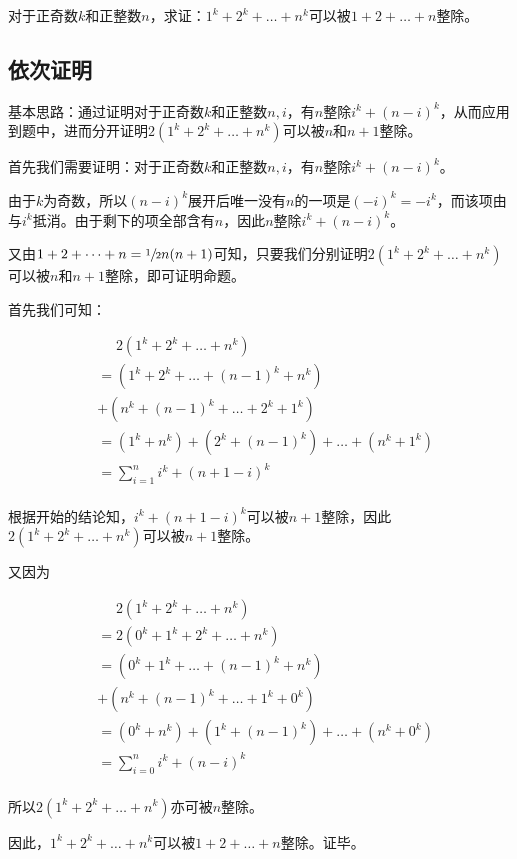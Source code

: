 

对于正奇数$k$和正整数$n$，求证：$1^k + 2^k + \dots + n^k$可以被$1 + 2 + \dots + n$整除。

\subsection{依次证明}

基本思路：通过证明对于正奇数$k$和正整数$n, i$，有$n$整除$i^k + (n - i)^k$，从而应用到题中，进而分开证明$2(1^k + 2^k + \dots + n^k)$可以被$n$和$n + 1$整除。

首先我们需要证明：对于正奇数$k$和正整数$n, i$，有$n$整除$i^k + (n - i)^k$。

由于$k$为奇数，所以$(n - i)^k$展开后唯一没有$n$的一项是$(-i)^k = -i^k$，而该项由与$i^k$抵消。由于剩下的项全部含有$n$，因此$n$整除$i^k + (n - i)^k$。

又由$1 + 2 + \dots + n = \sfrac12n(n + 1)$可知，只要我们分别证明$2(1^k + 2^k + \dots + n^k)$可以被$n$和$n + 1$整除，即可证明命题。

首先我们可知：

\begin{align*}
  &\phantom{=} 2(1^k + 2^k + \dots + n^k) \\
  &= (1^k + 2^k + \dots + (n - 1)^k + n^k) \\
  &+ (n^k + (n - 1)^k + \dots + 2^k + 1^k) \\
  &= (1^k + n^k) + (2^k + (n - 1)^k) + \dots + (n^k + 1^k) \\
  &= \sum_{i = 1}^n i^k + (n + 1 - i)^k \\
\end{align*}

根据开始的结论知，$i^k + (n + 1 - i)^k$可以被$n + 1$整除，因此$2(1^k + 2^k + \dots + n^k)$可以被$n + 1$整除。

又因为

\begin{align*}
  &\phantom{=} 2(1^k + 2^k + \dots + n^k) \\
  &= 2(0^k + 1^k + 2^k + \dots + n^k) \\
  &= (0^k + 1^k + \dots + (n - 1)^k + n^k) \\
  &+ (n^k + (n - 1)^k + \dots + 1^k + 0^k) \\
  &= (0^k + n^k) + (1^k + (n - 1)^k) + \dots + (n^k + 0^k) \\
  &= \sum_{i = 0}^n i^k + (n - i)^k \\
\end{align*}

所以$2(1^k + 2^k + \dots + n^k)$亦可被$n$整除。

因此，$1^k + 2^k + \dots + n^k$可以被$1 + 2 + \dots + n$整除。证毕。
